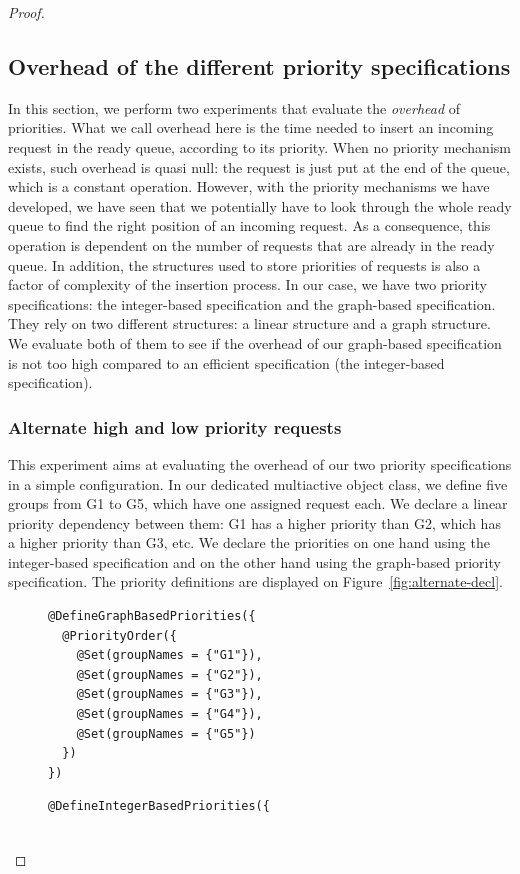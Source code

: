 \documentclass[11pt]{report}
\begin{document}
\begin{proof}
\subsection{Overhead of the different priority specifications}
In this section, we perform two experiments that evaluate the \emph{overhead} of priorities. What we call overhead here is the time needed to insert an incoming request in the ready queue, according to its priority. When no priority mechanism exists, such overhead is quasi null: the request is just put at the end of the queue, which is a constant operation. However, with the priority mechanisms we have developed, we have seen that we potentially have to look through the whole ready queue to find the right position of an incoming request. As a consequence, this operation is dependent on the number of requests that are already in the ready queue. In addition, the structures used to store priorities of requests is also a factor of complexity of the insertion process. In our case, we have two priority specifications: the integer-based specification and the graph-based specification. They rely on two different structures: a linear structure and a graph structure. We evaluate both of them to see if the overhead of our graph-based specification is not too high compared to an efficient specification (the integer-based specification). 

\subsubsection{Alternate high and low priority requests}
This experiment aims at evaluating the overhead of our two priority specifications in a simple configuration. In our dedicated multiactive object class, we define five groups from G1 to G5, which have one assigned request each. We declare a linear priority dependency between them: G1 has a higher priority than G2, which has a higher priority than G3, etc. We declare the priorities on one hand using the integer-based specification and on the other hand using the graph-based priority specification. The priority definitions are displayed on Figure~\ref{fig:alternate-decl}.

\begin{figure}[!ht]
	\lstset{language=java, numberstyle=\tiny, stepnumber=1, numbersep=5pt, basicstyle=\footnotesize}
	\begin{minipage}{0.41\textwidth}
	\begin{lstlisting}[frame=single]
@DefineGraphBasedPriorities({
  @PriorityOrder({
    @Set(groupNames = {"G1"}),
    @Set(groupNames = {"G2"}),
    @Set(groupNames = {"G3"}),
    @Set(groupNames = {"G4"}),
    @Set(groupNames = {"G5"})
  })
})
 	\end{lstlisting}
 	\end{minipage}
 	\nointerlineskip
	\begin{minipage}{0.57\textwidth}
	\begin{lstlisting}[frame=single]
@DefineIntegerBasedPriorities({


\end{lstlisting}
\end{minipage}
\end{figure}
\end{proof}
\end{document}
